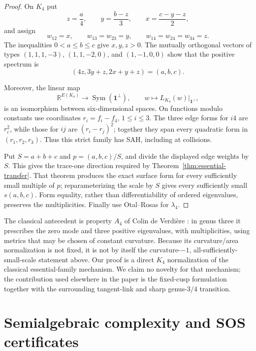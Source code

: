\documentclass[11pt,reqno]{amsart}
\theoremstyle{definition}
\theoremstyle{remark}
\newcommand{\one}{\mathbf 1}
\newcommand{\R}{\mathbb R}
\newcommand{\Sym}{\operatorname{Sym}}
\begin{document}
\begin{proof}
On $K_4$ put
\[
 z=\frac a4,\qquad y=\frac{b-z}{3},\qquad
 x=\frac{c-y-z}{2},
\]
and assign
\[
 w_{12}=x,\qquad w_{13}=w_{23}=y,\qquad
 w_{14}=w_{24}=w_{34}=z.
\]
The inequalities $0<a\le b\le c$ give $x,y,z>0$.  The mutually orthogonal
vectors of types $(1,1,1,-3)$, $(1,1,-2,0)$, and $(1,-1,0,0)$ show that the
positive spectrum is
\[
 (4z,3y+z,2x+y+z)=(a,b,c).
\]

Moreover, the linear map
\begin{equation}\label{eq:K4-form-isomorphism}
 \R^{E(K_4)}\longrightarrow\Sym(\one^\perp),\qquad
 w\longmapsto L_{K_4}(w)|_{\one^\perp},
\end{equation}
is an isomorphism between six-dimensional spaces.  On functions modulo
constants use coordinates $r_i=f_i-f_4$, $1\le i\le3$.  The three edge forms
for $i4$ are $r_i^2$, while those for $ij$ are $(r_i-r_j)^2$; together they
span every quadratic form in $(r_1,r_2,r_3)$.  Thus this strict family has
SAH, including at collisions.

Put $S=a+b+c$ and $p=(a,b,c)/S$, and divide the displayed edge weights by
$S$.  This gives the trace-one direction required by
Theorem~\ref{thm:essential-transfer}.  That theorem produces the exact
surface form for every sufficiently small multiple of $p$; reparameterizing
the scale by $S$ gives every sufficiently small $s(a,b,c)$.  Form equality,
rather than differentiability of ordered eigenvalues, preserves the
multiplicities.  Finally use Otal--Rosas for $\lambda_4$.
\end{proof}

The classical antecedent is property $A_4$ of Colin de Verdi\`ere
\cite[Theorem~1.3 and \S2a]{CdV1987}: in genus three it prescribes the zero
mode and three positive eigenvalues, with multiplicities, using metrics that
may be chosen of constant curvature.  Because its curvature/area
normalization is not fixed, it is not by itself the curvature-$-1$,
all-sufficiently-small-scale statement above.  Our proof is a direct $K_4$
normalization of the classical essential-family mechanism.  We claim no
novelty for that mechanism; the contribution used elsewhere in the paper is
the fixed-cusp formulation together with the surrounding tangent-link and
sharp genus-$3/4$ transition.

\section{Semialgebraic complexity and SOS certificates}
\label{sec:complexity}
\end{document}
